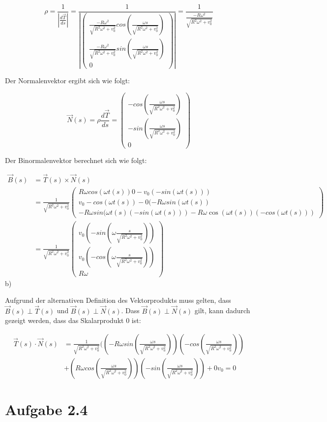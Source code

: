 \documentclass{theozettel}
\begin{document}
$$
\rho = \frac{1}{|\frac{d\vec{T}}{ds}|} = \frac{1}{|\begin{pmatrix}
\frac{- R \omega^{2}}{\sqrt{R^{2} \omega^{2} + v_0^{2}}}cos(\frac{\omega s}{\sqrt{R^{2} \omega^{2} + v_0^{2}}}) \\
\frac{- R \omega^{2}}{\sqrt{R^{2} \omega^{2} + v_0^{2}}}sin(\frac{\omega s}{\sqrt{R^{2} \omega^{2} + v_0^{2}}}) \\
0
\end{pmatrix} |} = \frac{1}{\frac{- R \omega^{2}}{\sqrt{R^{2} \omega^{2} + v_0^{2}}}}
$$

Der Normalenvektor ergibt sich wie folgt:

$$
\vec{N}(s) = \rho \frac{d\vec{T}}{ds} =\begin{pmatrix}
-cos(\frac{\omega s}{\sqrt{R^{2} \omega^{2} + v_0^{2}}}) \\
-sin(\frac{\omega s}{\sqrt{R^{2} \omega^{2} + v_0^{2}}}) \\
0
\end{pmatrix} 
$$

Der Binormalenvektor berechnet sich wie folgt:

\begin{align}
\vec{B}(s) &= \vec{T}(s) \times \vec{N}(s) \\&= \frac{1}{\sqrt{R^{2} \omega^{2} + v_0^{2}}} \begin{pmatrix}
R \omega cos(\omega t(s)) 0 - v_0 (-sin(\omega t(s))) \\
v_0 -cos(\omega t(s)) - 0 (-R \omega sin(\omega t(s)) \\
-R \omega sin(\omega t(s) (-sin(\omega t(s)))  - R \omega \cos(\omega t(s)) (-cos(\omega t(s)))
\end{pmatrix} \\ &= \frac{1}{\sqrt{R^{2} \omega^{2} + v_0^{2}}} \begin{pmatrix}
v_0 (-sin(\omega \frac{s}{\sqrt{R^{2} \omega^{2} + v_0^{2}}})) \\
v_0 (-cos(\omega \frac{s}{\sqrt{R^{2} \omega^{2} + v_0^{2}}})) \\
R \omega
\end{pmatrix}
\end{align}
b)

Aufgrund der alternativen Definition des Vektorprodukts muss gelten, dass $\vec{B}(s) \perp \vec{T}(s)$ und $\vec{B}(s) \perp \vec{N}(s)$. Dass $\vec{B}(s) \perp \vec{N}(s)$ gilt, kann dadurch gezeigt werden, dass das Skalarprodukt $0$ ist:

\begin{align}
\vec{T}(s) \cdot \vec{N}(s) &= \frac{1}{\sqrt{R^{2} \omega^{2} + v_0^{2}}}
((- R \omega sin(\frac{\omega s}{\sqrt{R^{2} \omega^{2} + v_0^{2}}})) (-cos(\frac{\omega s}{\sqrt{R^{2} \omega^{2} + v_0^{2}}})) \\&+ (R \omega cos(\frac{\omega s}{\sqrt{R^{2} \omega^{2} + v_0^2}})) (-sin(\frac{\omega s}{\sqrt{R^{2} \omega^{2}
+ v_0^{2}}})) + 0 v_0 = 0
\end{align}




\newpage
\section*{Aufgabe 2.4}
\end{document}
